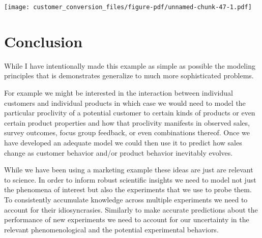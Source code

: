 \documentclass[
  letterpaper,
  DIV=11,
  numbers=noendperiod]{scrartcl}
\newenvironment{Shaded}{\begin{snugshade}}{\end{snugshade}}
\newcommand{\AttributeTok}[1]{\textcolor[rgb]{0.40,0.45,0.13}{#1}}
\newcommand{\ControlFlowTok}[1]{\textcolor[rgb]{0.00,0.23,0.31}{#1}}
\newcommand{\DecValTok}[1]{\textcolor[rgb]{0.68,0.00,0.00}{#1}}
\newcommand{\FunctionTok}[1]{\textcolor[rgb]{0.28,0.35,0.67}{#1}}
\newcommand{\NormalTok}[1]{\textcolor[rgb]{0.00,0.23,0.31}{#1}}
\newcommand{\OtherTok}[1]{\textcolor[rgb]{0.00,0.23,0.31}{#1}}
\newcommand{\SpecialCharTok}[1]{\textcolor[rgb]{0.37,0.37,0.37}{#1}}
\newcommand{\StringTok}[1]{\textcolor[rgb]{0.13,0.47,0.30}{#1}}
\begin{document}
\begin{Shaded}
\end{Shaded}

\texttt{[image: customer\_conversion\_files/figure-pdf/unnamed-chunk-47-1.pdf]}

\section{Conclusion}\label{conclusion}

While I have intentionally made this example as simple as possible the
modeling principles that is demonstrates generalize to much more
sophisticated problems.

For example we might be interested in the interaction between individual
customers and individual products in which case we would need to model
the particular proclivity of a potential customer to certain kinds of
products or even certain product properties and how that proclivity
manifests in observed sales, survey outcomes, focus group feedback, or
even combinations thereof. Once we have developed an adequate model we
could then use it to predict how sales change as customer behavior
and/or product behavior inevitably evolves.

While we have been using a marketing example these ideas are just are
relevant to science. In order to inform robust scientific insights we
need to model not just the phenomena of interest but also the
experiments that we use to probe them. To consistently accumulate
knowledge across multiple experiments we need to account for their
idiosyncrasies. Similarly to make accurate predictions about the
performance of new experiments we need to account for our uncertainty in
the relevant phenomenological and the potential experimental behaviors.
\end{document}
